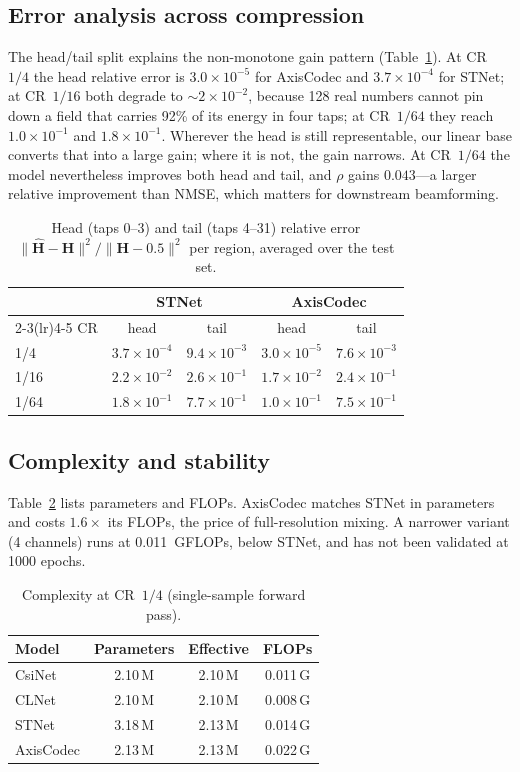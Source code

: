 \documentclass[journal]{IEEEtran}
\newcommand{\Hb}{\mathbf{H}}
\newcommand{\Hh}{\hat{\mathbf{H}}}
\begin{document}
\subsection{Error analysis across compression}
The head/tail split explains the non-monotone gain pattern
(Table~\ref{tab:headtail}). At CR~$1/4$ the head relative error is
$3.0\times10^{-5}$ for AxisCodec and $3.7\times10^{-4}$ for STNet; at CR~$1/16$
both degrade to $\sim2\times10^{-2}$, because 128 real numbers cannot pin down a
field that carries 92\% of its energy in four taps; at CR~$1/64$ they reach
$1.0\times10^{-1}$ and $1.8\times10^{-1}$. Wherever the head is still
representable, our linear base converts that into a large gain; where it is not,
the gain narrows. At CR~$1/64$ the model nevertheless improves both head and tail,
and $\rho$ gains $0.043$---a larger relative improvement than NMSE, which matters
for downstream beamforming.

\begin{table}[!t]
\centering
\caption{Head (taps 0--3) and tail (taps 4--31) relative error
$\|\Hh-\Hb\|^2/\|\Hb-0.5\|^2$ per region, averaged over the test set.}
\label{tab:headtail}
\footnotesize
\begin{tabular}{@{}lcccc@{}}
\toprule
& \multicolumn{2}{c}{STNet} & \multicolumn{2}{c}{AxisCodec}\\
\cmidrule(lr){2-3}\cmidrule(lr){4-5}
CR & head & tail & head & tail \\
\midrule
1/4 & $3.7{\times}10^{-4}$ & $9.4{\times}10^{-3}$ & $3.0{\times}10^{-5}$ & $7.6{\times}10^{-3}$\\
1/16 & $2.2{\times}10^{-2}$ & $2.6{\times}10^{-1}$ & $1.7{\times}10^{-2}$ & $2.4{\times}10^{-1}$\\
1/64 & $1.8{\times}10^{-1}$ & $7.7{\times}10^{-1}$ & $1.0{\times}10^{-1}$ & $7.5{\times}10^{-1}$\\
\bottomrule
\end{tabular}
\end{table}

\subsection{Complexity and stability}
Table~\ref{tab:cx} lists parameters and FLOPs. AxisCodec matches STNet in
parameters and costs $1.6\times$ its FLOPs, the price of full-resolution mixing.
A narrower variant (4 channels) runs at 0.011~GFLOPs, below STNet, and has not been
validated at 1000 epochs.

\begin{table}[!t]
\centering
\caption{Complexity at CR~$1/4$ (single-sample forward pass).}
\label{tab:cx}
\small
\begin{tabular}{@{}lccc@{}}
\toprule
Model & Parameters & Effective & FLOPs \\
\midrule
CsiNet & 2.10\,M & 2.10\,M & 0.011\,G\\
CLNet & 2.10\,M & 2.10\,M & 0.008\,G\\
STNet & 3.18\,M & 2.13\,M & 0.014\,G\\
AxisCodec & 2.13\,M & 2.13\,M & 0.022\,G\\
\bottomrule
\end{tabular}
\end{table}
\end{document}
